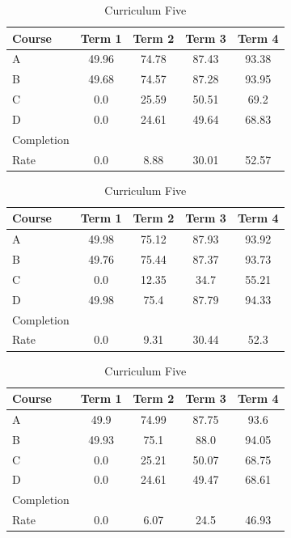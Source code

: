 \documentclass[botnum, fleqn]{unmeethesis}
\begin{document}
\begin{table}[!h]
      \vspace*{1cm}
      \begin{subtable}{0.45\linewidth}
        \centering
          \caption{Curriculum Three}
          \label{tab:simple91}
          \begin{tabular}{l*{4}{c}}
            Course  & Term 1 & Term 2 & Term 3 & Term 4 \\
            \hline
            A & 49.96 & 74.78 & 87.43 & 93.38 \\
            B & 49.68 & 74.57 & 87.28 & 93.95 \\
            C & 0.0   & 25.59 & 50.51 & 69.2  \\
            D & 0.0   & 24.61 & 49.64 & 68.83 \\
            \hline
            Completion \\ Rate & 0.0   & 8.88  & 30.01 & 52.57 \\
          \end{tabular}
      \end{subtable} 
      \hfill
      \begin{subtable}{0.45\linewidth}
        \centering
          \caption{Curriculum Four}
          \label{tab:simple92}
          \begin{tabular}{l*{4}{c}}
            Course  & Term 1 & Term 2 & Term 3 & Term 4 \\
            \hline
            A & 49.98 & 75.12 & 87.93 & 93.92 \\
            B & 49.76 & 75.44 & 87.37 & 93.73 \\
            C & 0.0   & 12.35 & 34.7  & 55.21 \\
            D & 49.98 & 75.4  & 87.79 & 94.33 \\
            \hline
            Completion \\ Rate & 0.0   & 9.31  & 30.44 & 52.3  \\
          \end{tabular}
      \end{subtable}

      \vspace*{1cm}
      \begin{subtable}{0.45\linewidth}
        \centering
          \caption{Curriculum Five}
          \label{tab:simple10}
          \begin{tabular}{l*{4}{c}}
            Course  & Term 1 & Term 2 & Term 3 & Term 4 \\
            \hline
            A & 49.9  & 74.99 & 87.75 & 93.6  \\
            B & 49.93 & 75.1  & 88.0  & 94.05 \\
            C & 0.0   & 25.21 & 50.07 & 68.75 \\
            D & 0.0   & 24.61 & 49.47 & 68.61 \\
            \hline
            Completion \\ Rate & 0.0   & 6.07  & 24.5  & 46.93 \\
          \end{tabular}
      \end{subtable} 
      \label{tab:simpleResults}
    \end{table}
\end{document}
